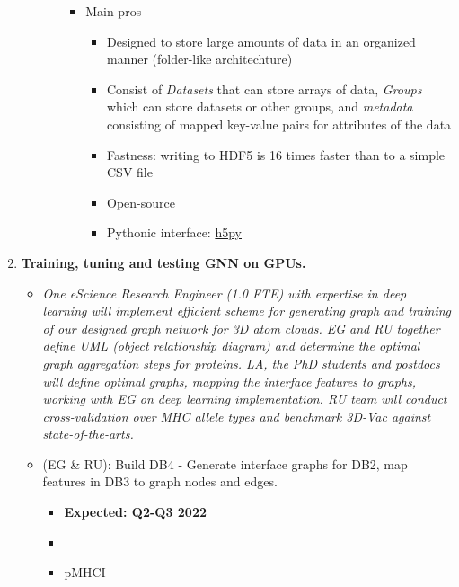 \begin{enumerate}[start=0,leftmargin=.7in,label={\bfseries \ding{118} Task \arabic*:}]
\begin{itemize}[label=]
\begin{itemize}
            \begin{itemize}
                \item Main pros
                \begin{itemize}
                    \item Designed to store large amounts of data in an organized manner (folder-like architechture)
                    \item Consist of \textit{Datasets} that can store arrays of data, \textit{Groups} which can store datasets or other groups,
and \textit{metadata} consisting of mapped key-value pairs for attributes of the data 
                    \item Fastness: writing to HDF5 is 16 times faster than to a simple CSV file
                    \item Open-source
                    \item Pythonic interface: \href{https://docs.h5py.org/en/latest/index.html}{h5py}
                \end{itemize}
            \end{itemize}
        \end{itemize}
    \end{itemize}
\item \textbf{Training, tuning and testing GNN on GPUs.}
    \begin{itemize}%
        \item \textit{One eScience Research Engineer (1.0 FTE) with expertise in deep learning will implement efficient scheme for
generating graph and training of our designed graph network for 3D atom clouds. EG and RU together define UML (object
relationship diagram) and determine the optimal graph aggregation steps for proteins. LA, the PhD students and postdocs
will define optimal graphs, mapping the interface features to graphs, working with EG on deep learning implementation.
RU team will conduct cross-validation over MHC allele types and benchmark 3D-Vac against state-of-the-arts.}
        \item (EG \& RU): Build DB4 - Generate interface graphs for DB2, map features in DB3 to graph nodes and edges.
        \begin{itemize}
            \item \textbf{Expected: Q2-Q3 2022}
            \item {}
            \item pMHCI
            \begin{itemize}

\end{itemize}
\end{itemize}
\end{itemize}
\end{enumerate}
